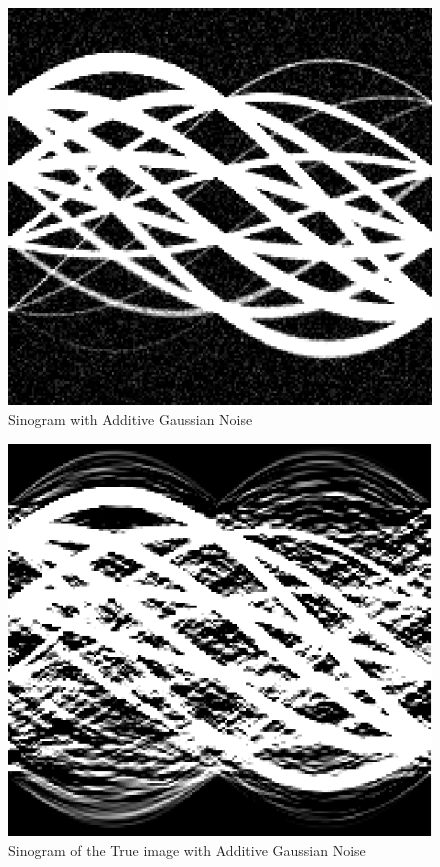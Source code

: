 \documentclass{article}
\begin{document}
\newpage
\begin{figure}[h]
  \includegraphics[width=\linewidth]{sino2.png}
  \caption{Sinogram with Additive Gaussian Noise}\label{sino2}
\end{figure}

\newpage
\begin{figure}[h]
  \includegraphics[width=\linewidth]{sino3.png}
  \caption{Sinogram of the True image with Additive Gaussian Noise}\label{sino3}
\end{figure}
\end{document}
